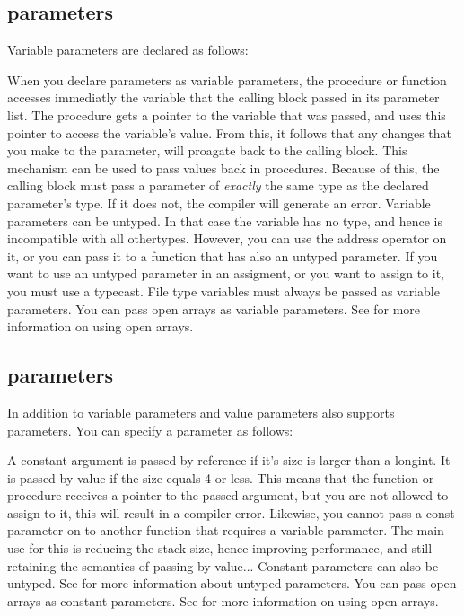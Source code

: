 \documentclass{report}
\begin{document}
\subsection{ parameters}
\label{se:varparams}
Variable parameters are declared as follows:

When you declare parameters as variable parameters, the procedure or
function accesses immediatly the variable that the calling block passed in
its parameter list. The procedure gets a pointer to the variable that was
passed, and uses this pointer to access the variable's value.
From this, it follows that any changes that you make to the parameter, will
proagate back to the calling block. This mechanism can be used to pass
values back in procedures.
Because of this, the calling block must pass a parameter of {\em exactly}
the same type as the declared parameter's type. If it does not, the compiler
will generate an error.
Variable parameters can be untyped. In that case the variable has no type,
and hence is incompatible with all othertypes. However, you can use the
address operator on it, or you can pass it to a function that has also an
untyped parameter. If you want to use an untyped parameter in an assigment,
or you want to assign to it, you must use a typecast.
File type variables must always be passed as variable parameters.
You can pass open arrays as variable parameters. See  for
more information on using open arrays.
\subsection{ parameters}
In addition to variable parameters and value parameters \fpc also supports
 parameters. You can specify a  parameter as follows:

A constant argument is passed by reference if it's size is larger than a
longint. It is passed by value if the size equals 4 or less.
This means that the function or procedure receives a pointer to the passed
argument, but you are not allowed to assign to it, this will result in a
compiler error. Likewise, you cannot pass a const parameter on to another
function that requires a variable parameter.
The main use for this is reducing the stack size, hence improving
performance, and still retaining the semantics of passing by value...
Constant parameters can also be untyped. See  for more
information about untyped parameters.
You can pass open arrays as constant parameters. See  for
more information on using open arrays.
\end{document}

